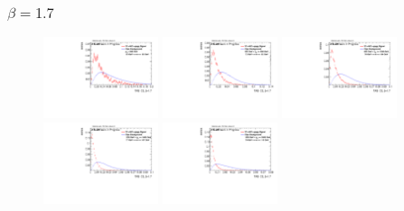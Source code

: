 \subsubsection*{$\beta=1.7$}
\begin{figure}[H]
\includegraphics[width=0.3\textwidth]{sascha_input/Appendix/Distributions/w/distributions/beta17/h_assisted_tj_C2_17_bin1.pdf} \hspace{1mm}
\includegraphics[width=0.3\textwidth]{sascha_input/Appendix/Distributions/w/distributions/beta17/h_assisted_tj_C2_17_bin2.pdf} \hspace{1mm}
\includegraphics[width=0.3\textwidth]{sascha_input/Appendix/Distributions/w/distributions/beta17/h_assisted_tj_C2_17_bin3.pdf} 
\bigskip
\includegraphics[width=0.3\textwidth]{sascha_input/Appendix/Distributions/w/distributions/beta17/h_assisted_tj_C2_17_bin4.pdf} \hspace{1mm}
\includegraphics[width=0.3\textwidth]{sascha_input/Appendix/Distributions/w/distributions/beta17/h_assisted_tj_C2_17_bin5.pdf} \hspace{1mm}

\end{figure}

